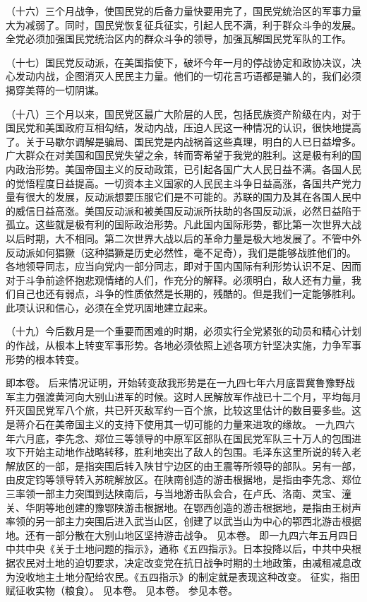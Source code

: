 （十六）三个月战争，使国民党的后备力量快要用完了，国民党统治区的军事力量大为减弱了。同时，国民党恢复征兵征实，引起人民不满，利于群众斗争的发展。全党必须加强国民党统治区内的群众斗争的领导，加强瓦解国民党军队的工作。

（十七）国民党反动派，在美国指使下，破坏今年一月的停战协定和政协决议，决心发动内战，企图消灭人民民主力量。他们的一切花言巧语都是骗人的，我们必须揭穿美蒋的一切阴谋。

（十八）三个月以来，国民党区最广大阶层的人民，包括民族资产阶级在内，对于国民党和美国政府互相勾结，发动内战，压迫人民这一种情况的认识，很快地提高了。关于马歇尔调解是骗局、国民党是内战祸首这些真理，明白的人已日益增多。广大群众在对美国和国民党失望之余，转而寄希望于我党的胜利。这是极有利的国内政治形势。美国帝国主义的反动政策，已引起各国广大人民日益不满。各国人民的觉悟程度日益提高。一切资本主义国家的人民民主斗争日益高涨，各国共产党力量有很大的发展，反动派想要压服它们是不可能的。苏联的国力及其在各国人民中的威信日益高涨。美国反动派和被美国反动派所扶助的各国反动派，必然日益陷于孤立。这些就是极有利的国际政治形势。凡此国内国际形势，都比第一次世界大战以后时期，大不相同。第二次世界大战以后的革命力量是极大地发展了。不管中外反动派如何猖獗（这种猖獗是历史必然性，毫不足奇），我们是能够战胜他们的。各地领导同志，应当向党内一部分同志，即对于国内国际有利形势认识不足、因而对于斗争前途怀抱悲观情绪的人们，作充分的解释。必须明白，敌人还有力量，我们自己也还有弱点，斗争的性质依然是长期的，残酷的。但是我们一定能够胜利。此项认识和信心，必须在全党巩固地建立起来。

（十九）今后数月是一个重要而困难的时期，必须实行全党紧张的动员和精心计划的作战，从根本上转变军事形势。各地必须依照上述各项方针坚决实施，力争军事形势的根本转变。


\begin{maonote}
即本卷。
后来情况证明，开始转变敌我形势是在一九四七年六月底晋冀鲁豫野战军主力强渡黄河向大别山进军的时候。这时人民解放军作战已十二个月，平均每月歼灭国民党军八个旅，共已歼灭敌军约一百个旅，比较这里估计的数目要多些。这是蒋介石在美帝国主义的支持下使用其一切可能的力量来进攻的缘故。
一九四六年六月底，李先念、郑位三等领导的中原军区部队在国民党军队三十万人的包围进攻下开始主动地作战略转移，胜利地突出了敌人的包围。毛泽东这里所说的转入老解放区的一部，是指突围后转入陕甘宁边区的由王震等所领导的部队。另有一部，由皮定钧等领导转入苏皖解放区。在陕南创造的游击根据地，是指由李先念、郑位三率领一部主力突围到达陕南后，与当地游击队会合，在卢氏、洛南、灵宝、潼关、华阴等地创建的豫鄂陕游击根据地。在鄂西创造的游击根据地，是指由王树声率领的另一部主力突围后进入武当山区，创建了以武当山为中心的鄂西北游击根据地。还有一部分散在大别山地区坚持游击战争。
见本卷。
即一九四六年五月四日中共中央《关于土地问题的指示》，通称《五四指示》。日本投降以后，中共中央根据农民对土地的迫切要求，决定改变党在抗日战争时期的土地政策，由减租减息改为没收地主土地分配给农民。《五四指示》的制定就是表现这种改变。
征实，指田赋征收实物（粮食）。
见本卷。
见本卷。
参见本卷。
\end{maonote}
